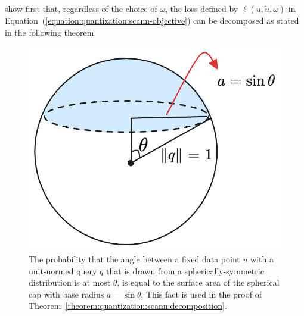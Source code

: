\cite{scann} show first that, regardless of the choice of $\omega$, the loss
defined by $\ell(u, \tilde{u}, \omega)$ in Equation~(\ref{equation:quantization:scann-objective})
can be decomposed as stated in the following theorem.

\begin{figure}[t]
    \centering
    \includegraphics[width=0.4\linewidth]{figures/clustering-spherical-cap.png}
    \caption{The probability that the angle between a fixed data point $u$ with a
    unit-normed query $q$ that is drawn from a spherically-symmetric distribution is at most $\theta$,
    is equal to the surface area of the spherical cap with base radius $a = \sin \theta$. This fact
    is used in the proof of Theorem~\ref{theorem:quantization:scann:decomposition}.}
    \label{figure:quantization:spherical-cap-area}
\end{figure}

